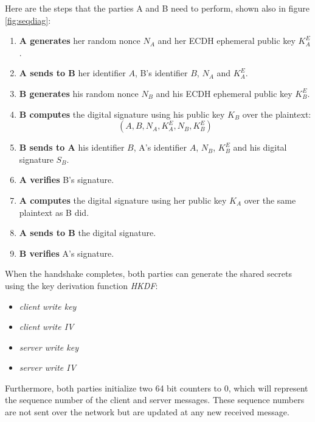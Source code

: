 Here are the steps that the parties A and B need to perform, shown also in figure
\ref{fig:seqdiag}:
\begin{enumerate}
    \item \textbf{A generates} her random nonce $N_A$ and her ECDH ephemeral public key $K^E_A$.
    \item \textbf{A sends to B} her identifier $A$, B's identifier $B$, $N_A$ and $K^E_A$.
    \item \textbf{B generates} his random nonce $N_B$ and his ECDH ephemeral public key $K^E_B$.
    \item \textbf{B computes} the digital signature using his public key $K_B$ over the plaintext:
    \begin{equation*}
            (A,B,N_A,K^E_A,N_B,K^E_B)
    \end{equation*}
    \item \textbf{B sends to A} his identifier $B$, A's identifier $A$, $N_B$, $K^E_B$ and his digital signature $S_B$.
    \item \textbf{A verifies} B's signature.
    \item \textbf{A computes} the digital signature using her public key $K_A$ over the same plaintext as B did.
    \item \textbf{A sends to B} the digital signature.
    \item \textbf{B verifies} A's signature.
\end{enumerate}

When the handshake completes, both parties can generate the shared secrets 
using the key derivation function \emph{HKDF}:
\begin{itemize}
    \item \emph{client write key}
    \item \emph{client write IV}
    \item \emph{server write key}
    \item \emph{server write IV}
\end{itemize}

Furthermore, both parties initialize two 64 bit counters to 0, which will 
represent the sequence number of the client and server messages. These sequence
numbers are not sent over the network but are updated at any new received
message.

